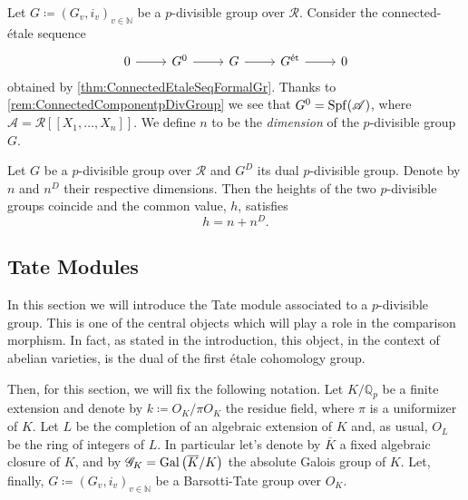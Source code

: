 \begin{defn}
	Let $G \coloneqq \left(G_{v}, i_v\right)_{v \in \mathbb{N}}$ be a $p$-divisible group
	over $\mathscr{R}$.
	Consider the connected-étale sequence 
	\begin{equation*}
	\begin{tikzcd}
		0 \arrow[r, "", rightarrow] &
		G^0 \arrow[r, "", rightarrow] &
		G \arrow[r, "", rightarrow] &
		G^{\mathrm{\acute et}} \arrow[r, "", rightarrow] &
		0
	\end{tikzcd}
	\end{equation*}
	obtained by 
	\cref{thm:ConnectedEtaleSeqFormalGr}.
	Thanks to \cref{rem:ConnectedComponentpDivGroup} we see that
	$G^0 = \operatorname{Spf}(\mathscr{A})$, where
	$\mathscr{A} = \mathscr{R} [\![ X_1, \ldots, X_{ n } ]\!]$.
	We define $n$ to be the \emph{dimension} of the $p$-divisible group $G$.
\end{defn}


\begin{prop}
	Let $G$ be a $p$-divisible group over $\mathscr{R}$
	and $G^D$ its dual $p$-divisible group.
	Denote by $n$ and $n^D$ their respective dimensions.
	Then the heights of the two $p$-divisible groups
	coincide and the common value, \(h\), satisfies
	\begin{equation*}
	h = n + n^D
	.\end{equation*}
\end{prop}



\subsection{Tate Modules}
In this section we will introduce the Tate module associated to a $p$-divisible group.
This is one of the central objects which will play a role in the comparison morphism.
In fact, as stated in the introduction, this object, in the context of
abelian varieties, is the dual of the first étale cohomology group.

Then, for this section, we will fix the following notation.
Let $K/\mathbb{Q}_p$ be a finite extension and denote by $k \coloneqq O_K/\pi O_K$
the residue field, where $\pi$ is a uniformizer of $K$.
Let $L$ be the completion of an algebraic extension of $K$ and, as usual,
$O_L$ be the ring of integers of $L$.
In particular let's denote by $\overline{K}$ a fixed algebraic closure
of $K$, and by $\mathscr{G}_K = \operatorname{Gal}\left( \overline{K} / K \right)$
the absolute Galois group of $K$.
Let, finally, $G \coloneqq \left( G_{ v }, i_v \right)_{ v \in \mathbb{N}}$ 
be a Barsotti-Tate group over $O_K$.


